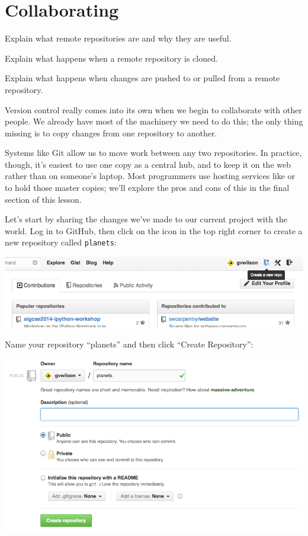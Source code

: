 \documentclass{book}
\begin{document}
\section{Collaborating}

\begin{objectives}
\begin{swcitemize}
\item
  Explain what remote repositories are and why they are useful.
\item
  Explain what happens when a remote repository is cloned.
\item
  Explain what happens when changes are pushed to or pulled from a
  remote repository.
\end{swcitemize}
\end{objectives}

Version control really comes into its own when we begin to collaborate
with other people. We already have most of the machinery we need to do
this; the only thing missing is to copy changes from one repository to
another.

Systems like Git allow us to move work between any two repositories. In
practice, though, it's easiest to use one copy as a central hub, and to
keep it on the web rather than on someone's laptop. Most programmers use
hosting services like  or
 to hold those master copies;
we'll explore the pros and cons of this in the final section of this
lesson.

Let's start by sharing the changes we've made to our current project
with the world. Log in to GitHub, then click on the icon in the top
right corner to create a new repository called \texttt{planets}:

\includegraphics{novice/git/img/github-create-repo-01.png}

Name your repository ``planets'' and then click ``Create Repository'':

\includegraphics{novice/git/img/github-create-repo-02.png}
\end{document}
